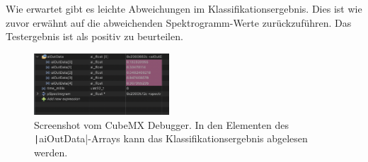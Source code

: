 \begin{adjustwidth}{0.5cm}{0cm}
Wie erwartet gibt es leichte Abweichungen im Klassifikationsergebnis. Dies ist wie zuvor erwähnt auf die abweichenden Spektrogramm-Werte zurückzuführen. Das Testergebnis ist als positiv zu beurteilen. 

\begin{figure}[h!]
\centering
\includegraphics[width=0.45\textwidth]{images/10_test_validierung/nn/nn-debuger-classification-result.png}
\caption{Screenshot vom CubeMX Debugger. In den Elementen des \texttt|aiOutData|-Arrays kann das Klassifikationsergebnis abgelesen werden.}
\label{fig:img-stm-classification-result}
\end{figure}

\end{adjustwidth}

